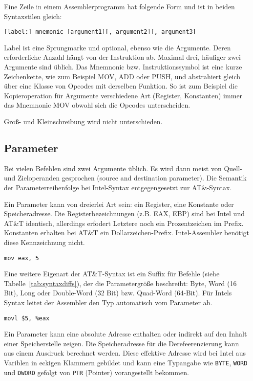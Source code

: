 Eine Zeile in einem Assemblerprogramm hat folgende Form und ist in beiden
Syntaxstilen gleich:

\texttt{[label:] mnemonic [argument1][, argument2][, argument3]}

Label ist eine Sprungmarke und optional, ebenso wie die Argumente. Deren
erforderliche Anzahl hängt von der Instruktion ab. Maximal drei, häufiger zwei
Argumente sind üblich. Das Mnemnonic bzw. Instruktionssymbol ist eine kurze
Zeichenkette, wie zum Beispiel MOV, ADD oder PUSH, und abstrahiert gleich über
eine Klasse von Opcodes mit derselben Funktion.\cite{intelmanual} So ist zum
Beispiel die Kopieroperation für Argumente verschiedene Art (Register,
Konstanten) immer das Mnemnonic MOV obwohl sich die Opcodes unterscheiden.

Groß- und Kleinschreibung wird nicht unterschieden.

\subsection{Parameter}

Bei vielen Befehlen sind zwei Argumente üblich. Es wird dann meist von Quell-
und Zieloperanden gesprochen (source and destination parameter). Die Semantik
der Parameterreihenfolge bei Intel-Syntax entgegengesetzt zur AT\&-Syntax.

Ein Parameter kann von dreierlei Art sein: ein Register, eine Konstante oder
Speicheradresse. Die Registerbezeichnungen (z.B. EAX, EBP) sind bei Intel und
AT\&T identisch, allerdings erfodert Letztere noch ein Prozentzeichen im
Prefix. Konstanten erhalten bei AT\&T ein Dollarzeichen-Prefix. Intel-Assembler
benötigt diese Kennzeichnung nicht.

\hspace{5mm} 
\texttt{mov eax, 5}

Eine weitere Eigenart der AT\&T-Syntax ist ein Suffix für Befehle (siehe
Tabelle~\ref{tab:syntaxdiffs}), der die Parametergröße beschreibt: Byte, Word
(16 Bit), Long oder Double-Word  (32 Bit) bzw.  Quad-Word (64-Bit). Für Intels
Syntax leitet der Assembler den Typ automatisch vom Parameter ab.

\hspace{5mm} 
\texttt{movl \$5, \%eax}

Ein Parameter kann eine absolute Adresse enthalten oder indirekt auf den Inhalt
einer Speicherstelle zeigen. Die Speicheradresse für die Derefeerenzierung kann
aus einem Ausdruck berechnet werden.  Diese effektive Adresse wird bei Intel
aus Variblen in eckigen Klammern gebildet und kann eine Typangabe wie
\texttt{BYTE},  \texttt{WORD} und \texttt{DWORD} gefolgt von  \texttt{PTR}
(Pointer) vorangestellt bekommen.

